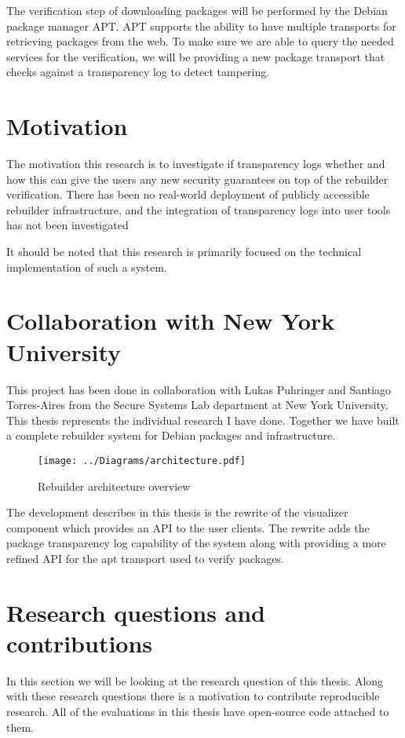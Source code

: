 \documentclass[../Main/thesis.tex]{subfiles}
\begin{document}
The verification step of downloading packages will be performed by the Debian
package manager APT. APT supports the ability to have multiple transports for
retrieving packages from the web. To make sure we are able to query the needed
services for the verification, we will be providing a new package transport that
checks against a transparency log to detect tampering.

\section{Motivation}\label{sec:motivation}
The motivation this research is to investigate if transparency logs whether and
how this can give the users any new security guarantees on top of the rebuilder
verification. There has been no real-world deployment of publicly accessible
rebuilder infrastructure, and the integration of transparency logs into user
tools has not been investigated 

It should be noted that this research is primarily focused on the technical
implementation of such a system.

\section{Collaboration with New York University}\label{sec:collab}
This project has been done in collaboration with Lukas Puhringer and Santiago
Torres-Aires from the Secure Systems Lab department at New York University. This
thesis represents the individual research I have done. Together we have built a
complete rebuilder system for Debian packages and infrastructure. 

\begin{figure}[H]
\centering
\texttt{[image: ../Diagrams/architecture.pdf]}
\caption{Rebuilder architecture overview}
\label{fig:rebuilder_architecture}
\end{figure}

The development describes in this thesis is the rewrite of the visualizer
component which provides an API to the user clients. The rewrite adds the
package transparency log capability of the system along with providing a more
refined API for the apt transport used to verify packages.

\section{Research questions and contributions}\label{sec:rq}
In this section we will be looking at the research question of this thesis.
Along with these research questions there is a motivation to contribute
reproducible research. All of the evaluations in this thesis have open-source
code attached to them.
\end{document}
